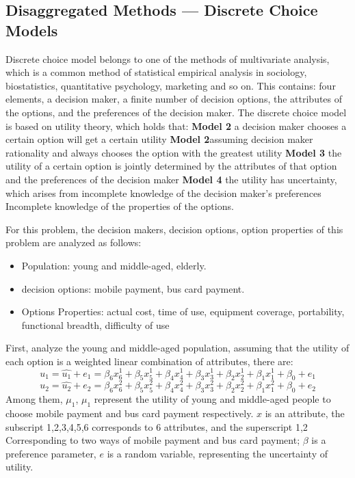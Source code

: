 \documentclass[../mcmpaper]{subfiles}
\begin{document}
\subsection{Disaggregated Methods --- Discrete Choice Models}
Discrete choice model belongs to one of the methods of multivariate analysis, which is a common method of statistical empirical analysis in sociology, biostatistics, quantitative psychology, marketing and so on. This contains: four elements, a decision maker, a finite number of decision options, the attributes of the options, and the preferences of the decision maker. The discrete choice model is based on utility theory, which holds that:  \textbf{Model 2} a decision maker chooses a certain option will get a certain utility \textbf{Model 2}assuming decision maker rationality and always chooses the option with the greatest utility \textbf{Model 3} the utility of a certain option is jointly determined by the attributes of that option and the preferences of the decision maker \textbf{Model 4} the utility has uncertainty, which arises from incomplete knowledge of the decision maker's preferences Incomplete knowledge of the properties of the options.
\par
For this problem, the decision makers, decision options, option properties of this problem are analyzed as follows:
\begin{itemize}[nosep]
    \item Population: young and middle-aged, elderly.
    \item decision options: mobile payment, bus card payment.
    \item Options Properties: actual cost, time of use, equipment coverage, portability, functional breadth, difficulty of use
\end{itemize}
\par
First, analyze the young and middle-aged population, assuming that the utility of each option is a weighted linear combination of attributes, there are:
\begin{equation}
u_{1}=\widehat{u_{1}}+e_{1}=\beta_{6} x_{6}^{1}+\beta_{5} x_{5}^{1}+\beta_{4} x_{4}^{1}+\beta_{3} x_{3}^{1}+\beta_{2} x_{2}^{1}+\beta_{1} x_{1}^{1}+\beta_{0}+e_{1}
\end{equation}
\begin{equation}
u_{2}=\widehat{u_{2}}+e_{2}=\beta_{6} x_{6}^{2}+\beta_{5} x_{5}^{2}+\beta_{4} x_{4}^{2}+\beta_{3} x_{3}^{2}+\beta_{2} x_{2}^{2}+\beta_{1} x_{1}^{2}+\beta_{0}+e_{2}
\end{equation}
Among them, $\mu_{1}$, $\mu_1$ represent the utility of young and middle-aged people to choose mobile payment and bus card payment respectively. $x$ is an attribute, the subscript {1,2,3,4,5,6} corresponds to 6 attributes, and the superscript {1,2} Corresponding to two ways of mobile payment and bus card payment; $\beta$ is a preference parameter, $e$ is a random variable, representing the uncertainty of utility.
\end{document}
